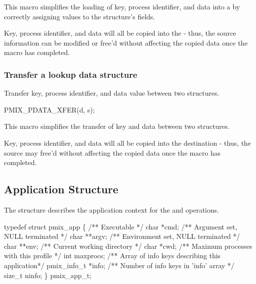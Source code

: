 This macro simplifies the loading of key, process identifier, and data into a  by correctly assigning values to the structure's fields.

\adviceuserstart
Key, process identifier, and data will all be copied into the  - thus, the source information can be modified or free'd without affecting the copied data once the macro has completed.
\adviceuserend

\subsubsection{Transfer a lookup data structure}

\summary

Transfer key, process identifier, and data value between two  structures.

\cspecificstart
\begin{codepar}
PMIX_PDATA_XFER(d, s);
\end{codepar}
\cspecificend

\begin{arglist}
\end{arglist}

This macro simplifies the transfer of key and data between two structures.

\adviceuserstart
Key, process identifier, and data will all be copied into the destination  - thus, the source  may free'd without affecting the copied data once the macro has completed.
\adviceuserend


\subsection{Application Structure}

The  structure describes the application context for the  and  operations.

\cspecificstart
\begin{codepar}
typedef struct pmix_app \{
    /** Executable */
    char *cmd;
    /** Argument set, NULL terminated */
    char **argv;
    /** Environment set, NULL terminated */
    char **env;
    /** Current working directory */
    char *cwd;
    /** Maximum processes with this profile */
    int maxprocs;
    /** Array of info keys describing this application*/
    pmix_info_t *info;
    /** Number of info keys in 'info' array */
    size_t ninfo;
\} pmix_app_t;
\end{codepar}
\cspecificend

